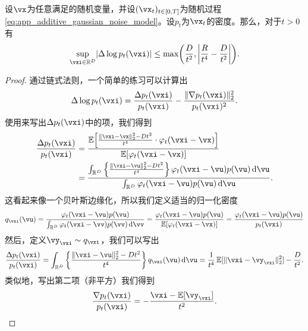 \documentclass[../../book-main.tex]{subfiles}
\begin{document}
\begin{lemma}\label{lem:app_diffusion_laplacian_control}
    设\(\vx\)为任意满足的随机变量，并设\((\vx_{t})_{t \in [0, T]}\)为随机过程\eqref{eq:app_additive_gaussian_noise_model}。设\(p_{t}\)为\(\vx_{t}\)的密度。那么，对于\(t > 0\)有
    \begin{equation}
        \sup_{\vxi \in \R^{D}}\abs{\Delta \log p_{t}(\vxi)} \leq \max\rp{\frac{D}{t^{2}}, \abs*{\frac{R}{t^{4}} - \frac{D}{t^{2}}}}.
    \end{equation}
\end{lemma}
\begin{proof}
    通过链式法则，一个简单的练习可以计算出
    \begin{equation}
        \Delta \log p_{t}(\vxi) = \frac{\Delta p_{t}(\vxi)}{p_{t}(\vxi)} - \frac{\norm{\nabla p_{t}(\vxi)}_{2}^{2}}{p_{t}(\vxi)^{2}}.
    \end{equation}
    使用来写出\(\Delta p_{t}(\vxi)\)中的项，我们得到
    \begin{align}
        \frac{\Delta p_{t}(\vxi)}{p_{t}(\vxi)}
        &= \frac{\Ex\rs{\frac{\norm{\vxi - \vx}_{2}^{2} - Dt^{2}}{t^{4}} \cdot \phi_{t}(\vxi - \vx)}}{\Ex[\phi_{t}(\vxi - \vx)]} \\
        &= \frac{\int_{\R^{D}}\bc{\frac{\norm{\vxi - \vu}_{2}^{2} - Dt^{2}}{t^{4}}}\phi_{t}(\vxi - \vu)p(\vu)\odif{\vu}}{\int_{\R^{D}}\phi_{t}(\vxi - \vu)p(\vu)\odif{\vu}}.
    \end{align}
    这看起来像一个贝叶斯边缘化，所以我们定义适当的归一化密度
    \begin{equation}
        q_{\vxi}(\vu) = \frac{\phi_{t}(\vxi - \vu)p(\vu)}{\int_{\R^{D}}\phi_{t}(\vxi - \vv)p(\vv)\odif{\vv}} = \frac{\phi_{t}(\vxi - \vu)p(\vu)}{\Ex[\phi_{t}(\vxi - \vx)]} = \frac{\phi_{t}(\vxi - \vu)p(\vu)}{p_{t}(\vxi)}
    \end{equation}
    然后，定义\(\vy_{\vxi} \sim q_{\vxi}\)，我们可以写出
    \begin{equation}
        \frac{\Delta p_{t}(\vxi)}{p_{t}(\vxi)} = \int_{\R^{D}}\bc{\frac{\norm{\vxi - \vu}_{2}^{2} - Dt^{2}}{t^{4}}}q_{\vxi}(\vu)\odif{\vu} = \frac{1}{t^{4}}\Ex[\norm{\vxi - \vy_{\vxi}}_{2}^{2}] - \frac{D}{t^{2}}.
    \end{equation}
    类似地，写出第二项（非平方）我们得到
    \begin{equation}
        \frac{\nabla p_{t}(\vxi)}{p_{t}(\vxi)} = -\frac{\vxi - \Ex[\vy_{\vxi}]}{t^{2}}.
    \end{equation}

\end{proof}
\end{document}
